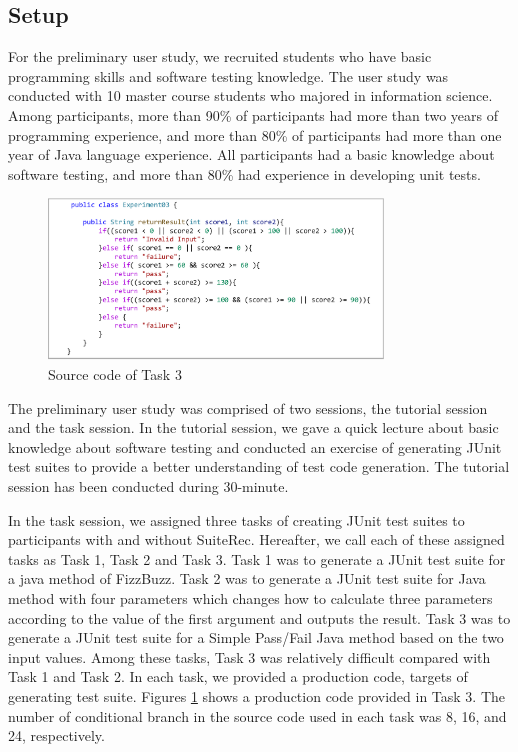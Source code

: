 \documentclass[conference]{IEEEtran}
\begin{document}
\subsection{Setup}
For the preliminary user study, we recruited students who have basic programming skills and software testing knowledge. The user study was conducted with 10 master course students who majored in information science. Among participants, more than 90\% of participants had more than two years of programming experience, and more than 80\% of participants had more than one year of Java language experience. All participants had a basic knowledge about software testing, and more than 80\% had experience in developing unit tests.





 \begin{figure}[htbp]
 \centerline{\includegraphics[width=8.9cm]{task.pdf}}
 \caption{Source code of Task 3}
 \label{fig4}
 \end{figure}


The preliminary user study was comprised of two sessions, the tutorial session and the task session. 
In the tutorial session, we gave a quick lecture about basic knowledge about software testing and conducted an exercise of generating JUnit test suites to provide a better understanding of test code generation. The tutorial session has been conducted during 30-minute.

In the task session, we assigned three tasks of creating JUnit test suites to participants with and without \textsf{SuiteRec}. Hereafter, we call each of these assigned tasks as Task 1, Task 2 and Task 3. Task 1 was to generate a JUnit test suite for a java method of FizzBuzz. Task 2 was to generate a JUnit test suite for Java method with four parameters which changes how to calculate three parameters according to the value of the first argument and outputs the result. Task 3 was to generate a JUnit test suite for a Simple Pass/Fail Java method based on the two input values. Among these tasks, Task 3 was relatively difficult compared with Task 1 and Task 2. 
In each task, we provided a production code, targets of generating test suite. Figures \ref{fig4} shows a production code provided in Task 3. The number of conditional branch in the source code used in each task was 8, 16, and 24, respectively. 
\end{document}
